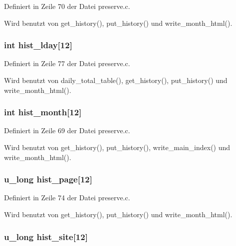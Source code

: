 Definiert in Zeile 70 der Datei preserve.c.

Wird benutzt von get\_\-history(), put\_\-history() und write\_\-month\_\-html().
\subsubsection{\setlength{\rightskip}{0pt plus 5cm}int {\bf hist\_\-lday}[12]}\label{preserve_8c_c1366de31d95191e4f8fe0894dabb4e2}




Definiert in Zeile 77 der Datei preserve.c.

Wird benutzt von daily\_\-total\_\-table(), get\_\-history(), put\_\-history() und write\_\-month\_\-html().
\subsubsection{\setlength{\rightskip}{0pt plus 5cm}int {\bf hist\_\-month}[12]}\label{preserve_8c_8dbdfde33bef98c2e3a8d2b8fab9143d}




Definiert in Zeile 69 der Datei preserve.c.

Wird benutzt von get\_\-history(), put\_\-history(), write\_\-main\_\-index() und write\_\-month\_\-html().
\subsubsection{\setlength{\rightskip}{0pt plus 5cm}u\_\-long {\bf hist\_\-page}[12]}\label{preserve_8c_6885f98057e49be4b1a58cc1fea67b11}




Definiert in Zeile 74 der Datei preserve.c.

Wird benutzt von get\_\-history(), put\_\-history() und write\_\-month\_\-html().
\subsubsection{\setlength{\rightskip}{0pt plus 5cm}u\_\-long {\bf hist\_\-site}[12]}\label{preserve_8c_95f554bfcd0bb37a1e90b29db92d2ffa}





